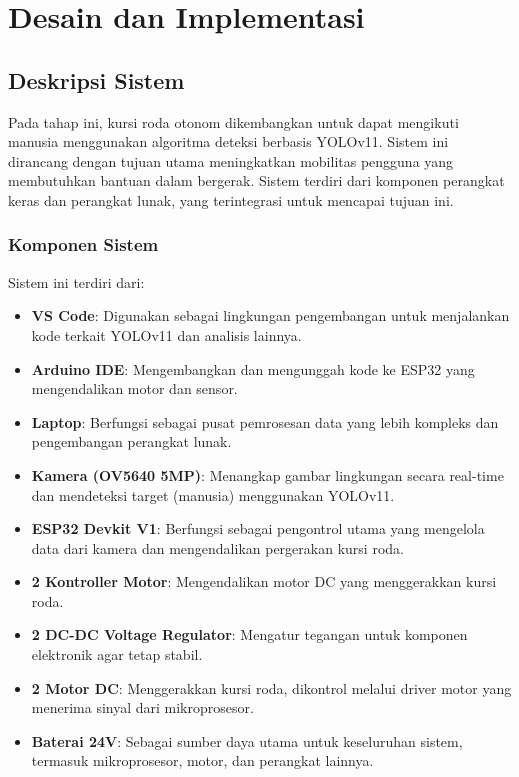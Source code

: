 \section{Desain dan Implementasi}
\label{sec:desaindanimplementasi}

\subsection{Deskripsi Sistem}
\label{subsec:deskripsisistem}

Pada tahap ini, kursi roda otonom dikembangkan untuk dapat mengikuti manusia menggunakan algoritma deteksi berbasis YOLOv11. Sistem ini dirancang dengan tujuan utama meningkatkan mobilitas pengguna yang membutuhkan bantuan dalam bergerak. Sistem terdiri dari komponen perangkat keras dan perangkat lunak, yang terintegrasi untuk mencapai tujuan ini.

\subsubsection{Komponen Sistem}
\label{subsubsec:komponensistem}

Sistem ini terdiri dari:

\begin{itemize}
    \item \textbf{VS Code}: Digunakan sebagai lingkungan pengembangan untuk menjalankan kode terkait YOLOv11 dan analisis lainnya.
    \item \textbf{Arduino IDE}: Mengembangkan dan mengunggah kode ke ESP32 yang mengendalikan motor dan sensor.
    \item \textbf{Laptop}: Berfungsi sebagai pusat pemrosesan data yang lebih kompleks dan pengembangan perangkat lunak.
    \item \textbf{Kamera (OV5640 5MP)}: Menangkap gambar lingkungan secara real-time dan mendeteksi target (manusia) menggunakan YOLOv11.
    \item \textbf{ESP32 Devkit V1}: Berfungsi sebagai pengontrol utama yang mengelola data dari kamera dan mengendalikan pergerakan kursi roda.
    \item \textbf{2 Kontroller Motor}: Mengendalikan motor DC yang menggerakkan kursi roda.
    \item \textbf{2 DC-DC Voltage Regulator}: Mengatur tegangan untuk komponen elektronik agar tetap stabil.
    \item \textbf{2 Motor DC}: Menggerakkan kursi roda, dikontrol melalui driver motor yang menerima sinyal dari mikroprosesor.
    \item \textbf{Baterai 24V}: Sebagai sumber daya utama untuk keseluruhan sistem, termasuk mikroprosesor, motor, dan perangkat lainnya.
\end{itemize}


